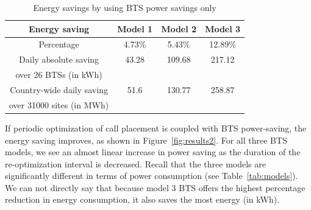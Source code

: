 \begin{table}
\centering
\begin{tabular}{|c|c|c|c|}
\hline Energy saving & Model 1 & Model 2 & Model 3 \\
\hline Percentage & 4.73\% & 5.43\% & 12.89\% \\
\hline Daily absolute saving & 43.28 & 109.68 & 217.12 \\
over 26 BTSs (in kWh) & \ & \ & \ \\
\hline Country-wide daily saving & 51.6 & 130.77 & 258.87\\
over 31000 sites (in MWh) & \ & \ & \ \\
\hline
\end{tabular}
\caption{Energy savings by using BTS power savings only}
\label{tab:psonly}
\end{table}


If periodic optimization of call placement is coupled with BTS power-saving, the energy saving improves, as shown in Figure~\ref{fig:results2}.
%
For all three BTS models, we see an almost linear increase in power saving as the duration of the re-optimization interval is decreased. Recall that the three models are significantly different in terms of power consumption (see Table~\ref{tab:models}). We can not directly say that because model 3 BTS offers the highest percentage reduction in energy consumption, it also saves the most energy (in kWh). %

